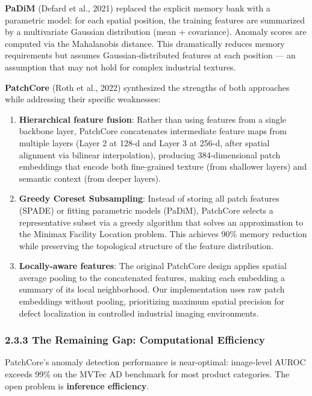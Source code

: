\textbf{PaDiM} (Defard et al., 2021) replaced the explicit memory bank with a parametric model: for each spatial position, the training features are summarized by a multivariate Gaussian distribution (mean + covariance). Anomaly scores are computed via the Mahalanobis distance. This dramatically reduces memory requirements but assumes Gaussian-distributed features at each position --- an assumption that may not hold for complex industrial textures.

\textbf{PatchCore} (Roth et al., 2022) synthesized the strengths of both approaches while addressing their specific weaknesses:

\begin{enumerate}
\def\labelenumi{\arabic{enumi}.}
\item
  \textbf{Hierarchical feature fusion}: Rather than using features from a single backbone layer, PatchCore concatenates intermediate feature maps from multiple layers (Layer 2 at 128-d and Layer 3 at 256-d, after spatial alignment via bilinear interpolation), producing 384-dimensional patch embeddings that encode both fine-grained texture (from shallower layers) and semantic context (from deeper layers).
\item
  \textbf{Greedy Coreset Subsampling}: Instead of storing all patch features (SPADE) or fitting parametric models (PaDiM), PatchCore selects a representative subset via a greedy algorithm that solves an approximation to the Minimax Facility Location problem. This achieves 90\% memory reduction while preserving the topological structure of the feature distribution.
\item
  \textbf{Locally-aware features}: The original PatchCore design applies spatial average pooling to the concatenated features, making each embedding a summary of its local neighborhood. Our implementation uses raw patch embeddings without pooling, prioritizing maximum spatial precision for defect localization in controlled industrial imaging environments.
\end{enumerate}

\subsubsection{2.3.3 The Remaining Gap: Computational Efficiency}\label{the-remaining-gap-computational-efficiency}

PatchCore's anomaly detection performance is near-optimal: image-level AUROC exceeds 99\% on the MVTec AD benchmark for most product categories. The open problem is \textbf{inference efficiency}.

